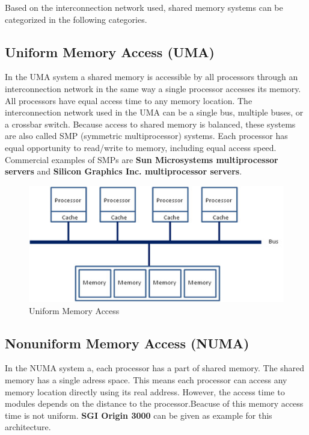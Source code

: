 \documentclass[11pt]{article}
\begin{document}
Based on the interconnection network used, shared
memory systems can be categorized in the following categories.

\subsection{Uniform Memory Access (UMA)}
In the UMA system a shared memory is accessible by all processors through an
interconnection network in the same way a single processor accesses its memory.
All processors have equal access time to any memory location. The interconnection
network used in the UMA can be a single bus, multiple buses, or a crossbar switch.
Because access to shared memory is balanced, these systems are also called SMP
(symmetric multiprocessor) systems. Each processor has equal opportunity to
read/write to memory, including equal access speed. Commercial examples of
SMPs are \textbf{Sun Microsystems multiprocessor servers} and \textbf{Silicon Graphics Inc. multiprocessor servers}.
\begin{figure}[htp]
\centering
\includegraphics[scale=0.50]{39352-figure-1.jpg}
\caption{Uniform Memory Access}
\end{figure}

\subsection{Nonuniform Memory Access (NUMA)}
In the NUMA system a, each processor has a part of shared memory. The shared memory has a single adress space. This means each processor can access any memory location directly using its real address. However, the access time to modules depends on the distance to the processor.Beacuse of this memory access time is not uniform. \textbf{SGI Origin 3000} can be given as example for this architecture.
\end{document}
